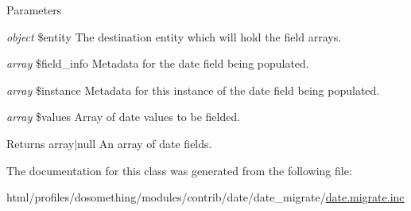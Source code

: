 \begin{DoxyParams}{Parameters}
\item[{\em object}]\$entity The destination entity which will hold the field arrays. \item[{\em array}]\$field\_\-info Metadata for the date field being populated. \item[{\em array}]\$instance Metadata for this instance of the date field being populated. \item[{\em array}]\$values Array of date values to be fielded.\end{DoxyParams}
\begin{DoxyReturn}{Returns}
array$|$null An array of date fields. 
\end{DoxyReturn}


The documentation for this class was generated from the following file:\begin{DoxyCompactItemize}
\item 
html/profiles/dosomething/modules/contrib/date/date\_\-migrate/\hyperlink{date_8migrate_8inc}{date.migrate.inc}\end{DoxyCompactItemize}
